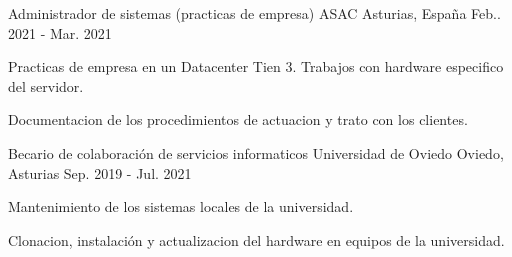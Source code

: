 

\begin{cventries}

  \cventry
    {Administrador de sistemas (practicas de empresa)} %
    {ASAC} %
    {Asturias, España} %
    {Feb.. 2021 - Mar. 2021} %
    {
      \begin{cvitems} %
        \item {Practicas de empresa en un Datacenter Tien 3. Trabajos con hardware especifico del servidor.}
        \item {Documentacion de los procedimientos de actuacion y trato con los clientes.}
      \end{cvitems}
    }

  \cventry
    {Becario de colaboración de servicios informaticos} %
    {Universidad de Oviedo} %
    {Oviedo, Asturias} %
    {Sep. 2019 - Jul. 2021} %
    {
      \begin{cvitems} %
        \item {Mantenimiento de los sistemas locales de la universidad.}
        \item {Clonacion, instalación y actualizacion del hardware en equipos de la universidad.}
      \end{cvitems}
    }

\end{cventries}
